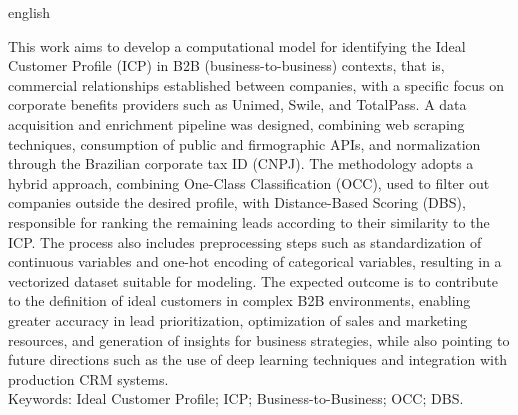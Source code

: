 \documentclass[
        oneside,      %
        english,			
        brazil			 
        ]{abntbibufjf}
\begin{document}
 
\begin{resumo}[ABSTRACT]
  \begin{otherlanguage*}{english}

  This work aims to develop a computational model for identifying the Ideal Customer Profile (ICP) in B2B (business-to-business) contexts, that is, commercial relationships established between companies, with a specific focus on corporate benefits providers such as Unimed, Swile, and TotalPass. A data acquisition and enrichment pipeline was designed, combining web scraping techniques, consumption of public and firmographic APIs, and normalization through the Brazilian corporate tax ID (CNPJ). The methodology adopts a hybrid approach, combining One-Class Classification (OCC), used to filter out companies outside the desired profile, with Distance-Based Scoring (DBS), responsible for ranking the remaining leads according to their similarity to the ICP. The process also includes preprocessing steps such as standardization of continuous variables and one-hot encoding of categorical variables, resulting in a vectorized dataset suitable for modeling. The expected outcome is to contribute to the definition of ideal customers in complex B2B environments, enabling greater accuracy in lead prioritization, optimization of sales and marketing resources, and generation of insights for business strategies, while also pointing to future directions such as the use of deep learning techniques and integration with production CRM systems. \\[18pt]

  Keywords: Ideal Customer Profile; ICP; Business-to-Business; OCC; DBS.

  \end{otherlanguage*}
\end{resumo}




\end{document}
